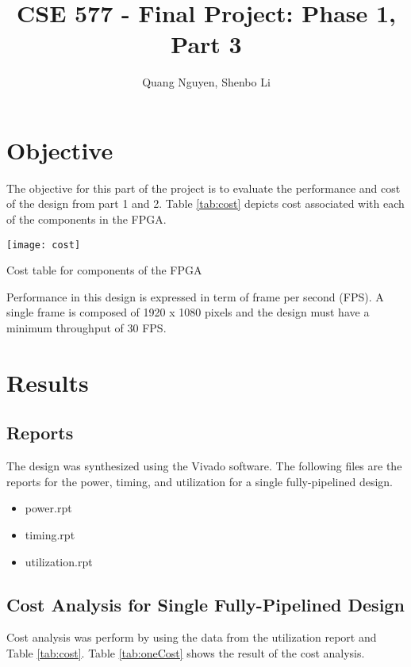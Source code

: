\documentclass[12pt]{article}
\title{CSE 577 - Final Project: Phase 1, Part 3}
\author{Quang Nguyen, Shenbo Li}
\begin{document}
\maketitle

\section{Objective}
The objective for this part of the project is to evaluate the performance and cost of the design from part 1 and 2. Table \ref{tab:cost} depicts cost associated with each of the components in the FPGA.\\ 


\begin{table}[h]
	\centering
	\texttt{[image: cost]}
	\caption{Cost table for components of the FPGA}
	\label{tab:cost}
\end{table}

Performance in this design is expressed in term of frame per second (FPS). A single frame is composed of 1920 x 1080 pixels and the design must have a minimum throughput of 30 FPS. \\

\section{Results}
\subsection{Reports}
The design was synthesized using the Vivado software. The following files are the reports for the power, timing, and utilization for a single fully-pipelined design.

\begin{itemize}
	\item power.rpt
	\item timing.rpt
	\item utilization.rpt
\end{itemize}

\subsection{Cost Analysis for Single Fully-Pipelined Design}
Cost analysis was perform by using the data from the utilization report and Table \ref{tab:cost}. Table \ref{tab:oneCost} shows the result of the cost analysis.\\
\end{document}
